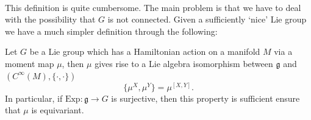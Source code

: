 \documentclass[11pt, final]{article}
\begin{document}
\paragraph{} This definition is quite cumbersome. The main problem is that we have to deal with the possibility that $ G $ is not connected. Given a sufficiently `nice' Lie group we have a much simpler definition through the following:

\begin{prop}
	Let $ G $ be a Lie group which has a Hamiltonian action on a manifold $ M $ via a moment map $ \mu $, then $ \mu $ gives rise to a Lie algebra isomorphism between $ \mathfrak{g} $ and $ \left( C^\infty(M), \{ \cdot, \cdot \} \right) $
		\begin{equation}\label{eq:ActionIso}
			\{ \mu^X, \mu^Y \} = \mu^{[X,Y]}.
		\end{equation}
	In particular, if $ \mathrm{Exp}: \mathfrak{g} \to G $ is surjective, then this property is sufficient ensure that $ \mu $ is equivariant.
\end{prop}
\end{document}

